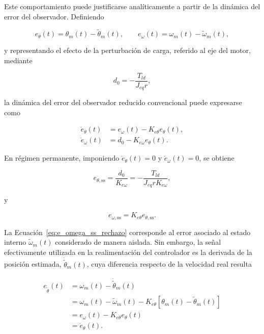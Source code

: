\documentclass[10pt,a4paper]{article}
\begin{document}
Este comportamiento puede justificarse analíticamente a partir de la
dinámica del error del observador. Definiendo

\begin{equation*}
	e_{\theta}(t)
	=
	\theta_m(t)-\widetilde{\theta}_m(t),
	\qquad
	e_{\omega}(t)
	=
	\omega_m(t)-\widetilde{\omega}_m(t),
	\label{eq:def_errores_obs_rechazo}
\end{equation*}

y representando el efecto de la perturbación de carga, referido al eje del
motor, mediante

\begin{equation*}
	d_0
	=
	-\frac{T_{ld}}{J_{eq}r},
	\label{eq:d0_rechazo}
\end{equation*}

la dinámica del error del observador reducido convencional puede
expresarse como

\begin{equation*}
	\begin{aligned}
		\dot e_{\theta}(t)
		&=
		e_{\omega}(t)-K_{e\theta}e_{\theta}(t),\\
		\dot e_{\omega}(t)
		&=
		d_0-K_{e\omega}e_{\theta}(t).
	\end{aligned}
	\label{eq:dinamica_error_obs_rechazo}
\end{equation*}

En régimen permanente, imponiendo
$\dot e_{\theta}(t)=0$ y $\dot e_{\omega}(t)=0$, se obtiene

\begin{equation*}
	e_{\theta,\mathrm{ss}}
	=
	\frac{d_0}{K_{e\omega}}
	=
	-\frac{T_{ld}}{J_{eq}rK_{e\omega}},
	\label{eq:e_theta_ss_rechazo}
\end{equation*}

y

\begin{equation*}
	e_{\omega,\mathrm{ss}}
	=
	K_{e\theta}e_{\theta,\mathrm{ss}}.
	\label{eq:e_omega_ss_rechazo}
\end{equation*}

La Ecuación~\eqref{eq:e_omega_ss_rechazo} corresponde al error asociado al
estado interno $\widetilde{\omega}_m(t)$ considerado de manera aislada.
Sin embargo, la señal efectivamente utilizada en la realimentación del
controlador es la derivada de la posición estimada,
$\dot{\widetilde{\theta}}_m(t)$, cuya diferencia respecto de la velocidad
real resulta

\begin{align*}
	e_{\dot{\widetilde{\theta}}}(t)
	&=
	\omega_m(t)-\dot{\widetilde{\theta}}_m(t)
	\nonumber\\
	&=
	\omega_m(t)-\widetilde{\omega}_m(t)
	-
	K_{e\theta}
	\left[
	\theta_m(t)-\widetilde{\theta}_m(t)
	\right]
	\nonumber\\
	&=
	e_{\omega}(t)-K_{e\theta}e_{\theta}(t)
	\nonumber\\
	&=
	\dot e_{\theta}(t).
	\label{eq:error_derivada_theta_est}
\end{align*}
\end{document}
